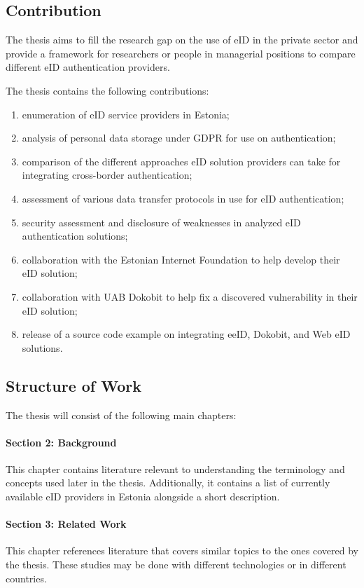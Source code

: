 \subsection{Contribution}

The thesis aims to fill the research gap on the use of eID in the private sector and provide a framework for researchers or people in managerial positions to compare different eID authentication providers.

The thesis contains the following contributions:

\begin{enumerate}
    \item enumeration of eID service providers in Estonia;
    \item analysis of personal data storage under GDPR for use on authentication;
    \item comparison of the different approaches eID solution providers can take for integrating cross-border authentication;
    \item assessment of various data transfer protocols in use for eID authentication;
    \item security assessment and disclosure of weaknesses in analyzed eID authentication solutions;
    \item collaboration with the Estonian Internet Foundation to help develop their eID solution;
    \item collaboration with UAB Dokobit to help fix a discovered vulnerability in their eID solution;
    \item release of a source code example on integrating eeID, Dokobit, and Web eID solutions.
\end{enumerate}

\subsection{Structure of Work}

The thesis will consist of the following main chapters:

\paragraph{Section 2: Background} This chapter contains literature relevant to understanding the terminology and concepts used later in the thesis. Additionally, it contains a list of currently available eID providers in Estonia alongside a short description.
\paragraph{Section 3: Related Work} This chapter references literature that covers similar topics to the ones covered by the thesis. These studies may be done with different technologies or in different countries.
